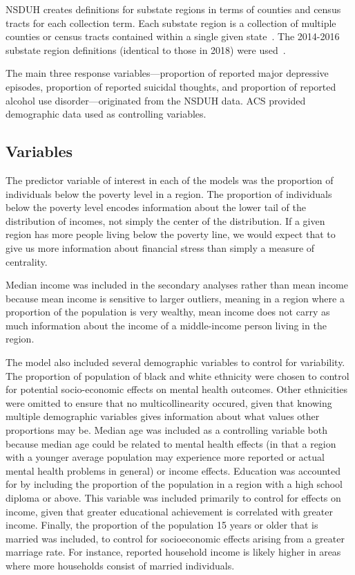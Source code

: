 \documentclass{article}
\begin{document}
NSDUH creates definitions for substate regions in terms of
counties and census tracts for each collection term.
Each substate region is a collection of multiple
counties or census tracts contained within a single
given state~\cite{samhsa_substate_region_defs}.
The 2014-2016 substate region definitions
(identical to those in 2018)
were used~\cite{samhsa_substate_region_defs}.

The main three response
variables---proportion of reported major depressive episodes,
proportion of reported suicidal thoughts,
and proportion of reported alcohol use disorder---originated
from the NSDUH data.
ACS provided demographic data used as controlling variables.

\subsection{Variables}\label{sec:finalvars}

The predictor variable of interest in each of the
models was the proportion of individuals below the poverty level in a region.
The proportion of individuals below the
poverty level encodes information about the lower tail of the
distribution of incomes, not simply the center of the distribution.
If a given region has more people living below the poverty line, we
would expect that to give us more information about financial stress
than simply a measure of centrality.

Median income was included in the secondary analyses rather than mean
income because mean income is sensitive to larger outliers, meaning in a
region where a proportion of the population is very wealthy, mean income
does not carry as much information about the income of a middle-income person
living in the region.

The model also included several demographic variables to control for
variability.
The proportion of population of black and white ethnicity
were chosen to control for potential socio-economic
effects on mental health outcomes. Other ethnicities were omitted to
ensure that no multicollinearity occured, given that knowing
multiple demographic variables gives information about what values other
proportions may be.
Median age was included as a controlling variable
both because median age could be related to mental health effects (in
that a region with a younger average population may experience more
reported or actual mental health problems in general) or income effects.
Education was accounted for by including the proportion of the
population in a region with a high school diploma or above. This
variable was included primarily to control for effects on income, given
that greater educational achievement is correlated with greater income.
Finally, the proportion of the population 15 years or older that is
married was included, to control for socioeconomic effects arising from
a greater marriage rate. For instance, reported household income is
likely higher in areas where more households consist of married
individuals.
\end{document}
